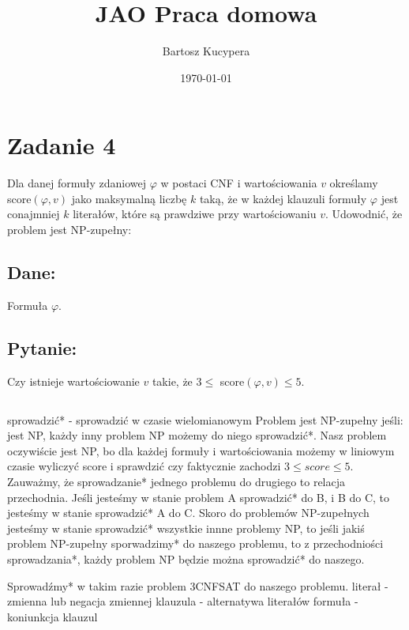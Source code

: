 \documentclass{article}
\title{JAO Praca domowa}
\author{Bartosz Kucypera}
\date{\today}
\begin{document}
\maketitle

\section*{Zadanie 4}
Dla danej formuły zdaniowej $\varphi$ w postaci CNF i wartościowania $v$ określamy score$(\varphi, v)$ jako maksymalną liczbę $k$ taką, że w każdej klauzuli formuły $\varphi$ jest conajmniej $k$ literałów, które są prawdziwe przy wartościowaniu $v$. \newline
Udowodnić, że problem jest NP-zupełny:
\subsection*{Dane:}
Formuła $\varphi$.
\subsection*{Pytanie:}
Czy istnieje wartościowanie $v$ takie, że $3\le$ score$(\varphi, v) \le 5$.

\subsection*{}
sprowadzić* - sprowadzić w czasie wielomianowym \newline \newline 
Problem jest NP-zupełny jeśli: jest NP, każdy inny problem NP możemy do niego sprowadzić*. \newline
Nasz problem oczywiście jest NP, bo dla każdej formuły i wartościowania możemy w liniowym czasie wyliczyć score i sprawdzić czy faktycznie zachodzi $3 \le score \le 5$. \newline \newline
Zauważmy, że sprowadzanie* jednego problemu do drugiego to relacja przechodnia. Jeśli jesteśmy w stanie problem A sprowadzić* do B, i B do C, to jesteśmy w stanie sprowadzić* A do C. \newline 
Skoro do problemów NP-zupełnych jesteśmy w stanie sprowadzić* wszystkie innne problemy NP, to jeśli jakiś problem NP-zupełny sporwadzimy* do naszego problemu, to z przechodniości sprowadzania*, każdy problem NP będzie można sprowadzić* do naszego.\newline

Sprowadźmy* w takim razie problem 3CNFSAT do naszego problemu. \newline \newline
literał - zmienna lub negacja zmiennej \newline
klauzula - alternatywa literałów \newline
formuła - koniunkcja klauzul \newline
\end{document}
